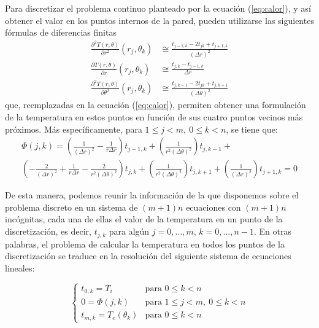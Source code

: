         Para discretizar el problema continuo planteado por la ecuación (\ref{eq:calor}), y así obtener el valor en los puntos internos de la pared, pueden utilizarse las siguientes fórmulas de diferencias finitas
        \begin{align*}
            \frac{\partial^2 T(r, \theta)}{\partial r^2}(r_j, \theta_k) &\cong \frac{t_{j-1,k} - 2 t_{jk} + t_{j+1,k}}{(\Delta r)^2} \\
            \frac{\partial T(r, \theta)}{\partial r}(r_j, \theta_k) &\cong \frac{t_{j,k} - t_{j-1,k}}{\Delta r} \\
            \frac{\partial^2 T(r, \theta)}{\partial \theta^2}(r_j, \theta_k) &\cong \frac{t_{j,k-1} - 2 t_{jk} + t_{j,k+1}}{(\Delta \theta)^2}
        \end{align*}
        que, reemplazadas en la ecuación (\ref{eq:calor}), permiten obtener una formulación de la temperatura en estos puntos en función de sus cuatro puntos vecinos más próximos. Más específicamente, para $1 \leq j < m,\ 0 \leq k < n$, se tiene que:
        \begin{multline} \label{eq:calor-discreto}
            \Phi(j,k) = \left( \frac{1}{(\Delta r)^2} - \frac{1}{r \Delta r} \right) t_{j-1,k} +
                \left( \frac{1}{r^2(\Delta \theta)^2} \right) t_{j,k-1} + \\
                \left( - \frac{2}{(\Delta r)^2} + \frac{1}{r \Delta r} - \frac{2}{r^2(\Delta \theta)^2} \right) t_{j,k} +
                \left( \frac{1}{r^2(\Delta \theta)^2} \right) t_{j,k+1} +
                \left( \frac{1}{(\Delta r)^2} \right) t_{j+1,k} = 0
        \end{multline}

        De esta manera, podemos reunir la información de la que disponemos sobre el problema discreto en un sistema de $(m+1)n$ ecuaciones con $(m+1)n$ incógnitas, cada una de ellas el valor de la temperatura en un punto de la discretización, es decir, $t_{j,k}$ para algún $j = 0, \dots, m$, $k = 0, \dots, n-1$. En otras palabras, el problema de calcular la temperatura en todos los puntos de la discretización se traduce en la resolución del siguiente sistema de ecuaciones lineales:

        \begin{equation} \label{eq:sistema}
            \begin{cases}
                t_{0,k} = T_i
                    & \text{para } 0 \leq k < n \\
                0 = \Phi(j,k)
                    & \text{para } 1 \leq j < m,\ 0 \leq k < n \\
                t_{m,k} = T_e(\theta_k)
                    & \text{para } 0 \leq k < n
            \end{cases}
        \end{equation}

